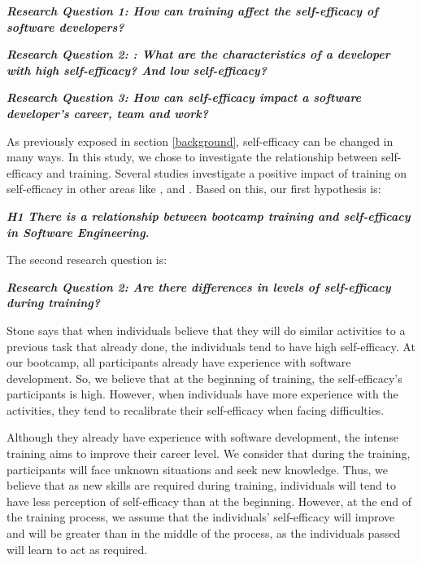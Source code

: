 \documentclass{TheMartianReport}
\begin{document}
\textbf{\textit{Research Question 1: How can training affect the self-efficacy of software developers?}}
 \newline

 \textbf{\textit{Research Question 2: : What are the characteristics of a developer with high self-efficacy? And low self-efficacy?}} 
 \newline

 \textbf{\textit{Research Question 3: How can self-efficacy impact a software developer's career, team and work?}}
 \newline
 
 
As previously exposed in section \ref{background}, self-efficacy can be changed in many ways. In this study, we chose to investigate the relationship between self-efficacy and training. Several studies investigate a positive impact of training on self-efficacy in other areas like \cite{gist1989effects}, \cite{gist1989influence} and \cite{tannenbaum1991meeting}. Based on this, our first hypothesis is:
 \newline
   
\textbf{\textit{H1 There is a relationship between bootcamp training and self-efficacy in Software Engineering.}}
 \newline
   
The second research question is:
 \newline
 
\textbf{\textit{Research Question 2:  Are there differences in levels of self-efficacy during training?}}   
 \newline
 
 Stone \cite{stone1994overconfidence} says that when individuals believe that they will do similar activities to a previous task that already done, the individuals tend to have high self-efficacy. At our bootcamp, all participants already have experience with software development. So, we believe that at the beginning of training, the self-efficacy's participants is high. However, when individuals have more experience with the activities, they tend to recalibrate their self-efficacy when facing difficulties.

Although they already have experience with software development, the intense training aims to improve their career level. We consider that during the training, participants will face unknown situations and seek new knowledge. Thus, we believe that as new skills are required during training, individuals will tend to have less perception of self-efficacy than at the beginning. However, at the end of the training process, we assume that the individuals' self-efficacy will improve and will be greater than in the middle of the process, as the individuals passed will learn to act as required.
\end{document}
